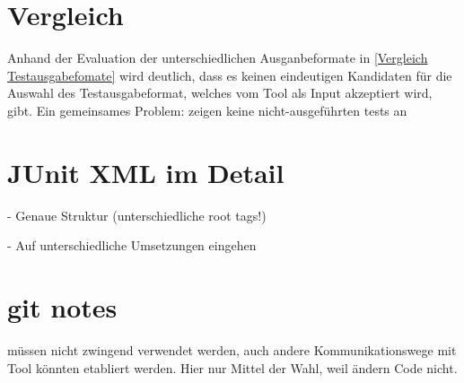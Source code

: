 \section{Vergleich}
Anhand der Evaluation der unterschiedlichen Ausganbeformate in \ref{Vergleich Testausgabefomate} wird deutlich, dass es keinen eindeutigen Kandidaten für die Auswahl des Testausgabeformat, welches vom Tool als Input akzeptiert wird, gibt. Ein gemeinsames Problem: zeigen keine nicht-ausgeführten tests an
\section{JUnit XML im Detail}
- Genaue Struktur (unterschiedliche root tags!)

- Auf unterschiedliche Umsetzungen eingehen

\section{git notes}
müssen nicht zwingend verwendet werden, auch andere Kommunikationswege mit Tool könnten etabliert werden. Hier nur Mittel der Wahl, weil ändern Code nicht.
